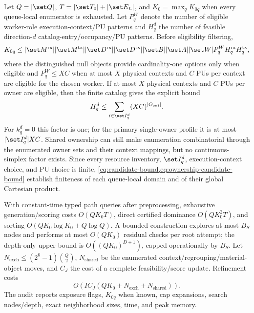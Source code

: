 Let $Q=|\set Q|$, $T=|\set T_0|+|\set E_L|$, and $K_0=\max_q K_{0q}$ when every queue-local enumerator is exhausted. Let $P_q^W$ denote the number of eligible worker-role execution-context/PU patterns and $H_q^d$ the number of feasible direction-$d$ catalog-entry/occupancy/PU patterns. Before eligibility filtering,
\begin{equation}
 K_{0q}\leq |\set M^{\mathrm{rx}}||\set M^{\mathrm{tx}}|
 |\set D^{\mathrm{rx}}||\set D^{\mathrm{tx}}||\set B||\set A||\set W|P_q^W
 H_q^{\mathrm{rx}}H_q^{\mathrm{tx}},
 \label{eq:candidate-bound}
\end{equation}
where the distinguished null objects provide cardinality-one options only when eligible and $P_q^W\leq XC$ when at most $X$ physical contexts and $C$ PUs per context are eligible for the chosen worker. If at most $X$ physical contexts and $C$ PUs per owner are eligible, then the finite catalog gives the explicit bound
\begin{equation}
 H_q^d\leq\sum_{i\in\set I_q^d}(XC)^{|O_{qdi}|}.
 \label{eq:ownership-candidate-bound}
\end{equation}
For $k_q^d=0$ this factor is one; for the primary single-owner profile it is at most $|\set I_q^d|XC$. Shared ownership can still make enumeration combinatorial through the enumerated owner sets and their context mappings, but no continuous-simplex factor exists. Since every resource inventory, $\set I_q^d$, execution-context choice, and PU choice is finite, \cref{eq:candidate-bound,eq:ownership-candidate-bound} establish finiteness of each queue-local domain and of their global Cartesian product.

With constant-time typed path queries after preprocessing, exhaustive generation/scoring costs $O(QK_0T)$, direct certified dominance $O(QK_0^2T)$, and sorting $O(QK_0\log K_0+Q\log Q)$. A bounded construction explores at most $B_S$ nodes and performs at most $O(QK_0)$ residual checks per root attempt; the depth-only upper bound is $O((QK_0)^{D+1})$, capped operationally by $B_S$. Let $N_{\mathrm{exch}}\leq(2^6-1)\binom Q2$, $N_{\mathrm{shared}}$ be the enumerated context/regrouping/material-object moves, and $C_J$ the cost of a complete feasibility/score update. Refinement costs
\begin{equation}
 O\!\left(I C_J(QK_0+N_{\mathrm{exch}}+N_{\mathrm{shared}})\right).
 \label{eq:refinement-complexity}
\end{equation}
The audit reports exposure flags, $K_{0q}$ when known, cap expansions, search nodes/depth, exact neighborhood sizes, time, and peak memory.

